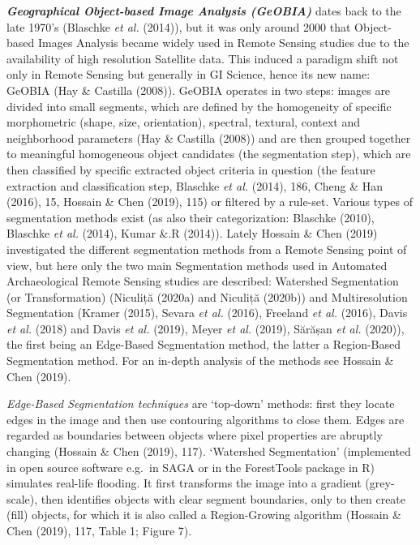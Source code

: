 \documentclass[
  12pt,
]{article}
\begin{document}
\textbf{\emph{Geographical Object-based Image Analysis (GeOBIA)}} dates back to the late 1970's (Blaschke \emph{et al.} (2014)), but it was only around 2000 that Object-based Images Analysis became widely used in Remote Sensing studies due to the availability of high resolution Satellite data. This induced a paradigm shift not only in Remote Sensing but generally in GI Science, hence its new name: GeOBIA (Hay \& Castilla (2008)). GeOBIA operates in two steps: images are divided into small segments, which are defined by the homogeneity of specific morphometric (shape, size, orientation), spectral, textural, context and neighborhood parameters (Hay \& Castilla (2008)) and are then grouped together to meaningful homogeneous object candidates (the segmentation step), which are then classified by specific extracted object criteria in question (the feature extraction and classification step, Blaschke \emph{et al.} (2014), 186, Cheng \& Han (2016), 15, Hossain \& Chen (2019), 115) or filtered by a rule-set. Various types of segmentation methods exist (as also their categorization: Blaschke (2010), Blaschke \emph{et al.} (2014), Kumar \&.R (2014)). Lately Hossain \& Chen (2019) investigated the different segmentation methods from a Remote Sensing point of view, but here only the two main Segmentation methods used in Automated Archaeological Remote Sensing studies are described: Watershed Segmentation (or Transformation) (Niculiță (2020a) and Niculiță (2020b)) and Multiresolution Segmentation (Kramer (2015), Sevara \emph{et al.} (2016), Freeland \emph{et al.} (2016), Davis \emph{et al.} (2018) and Davis \emph{et al.} (2019), Meyer \emph{et al.} (2019), Sărășan \emph{et al.} (2020)), the first being an Edge-Based Segmentation method, the latter a Region-Based Segmentation method. For an in-depth analysis of the methods see Hossain \& Chen (2019).

\emph{Edge-Based Segmentation techniques} are `top-down' methods: first they locate edges in the image and then use contouring algorithms to close them. Edges are regarded as boundaries between objects where pixel properties are abruptly changing (Hossain \& Chen (2019), 117). `Watershed Segmentation' (implemented in open source software e.g.~in SAGA or in the ForestTools package in R) simulates real-life flooding. It first transforms the image into a gradient (grey-scale), then identifies objects with clear segment boundaries, only to then create (fill) objects, for which it is also called a Region-Growing algorithm (Hossain \& Chen (2019), 117, Table 1; Figure 7).
\end{document}
